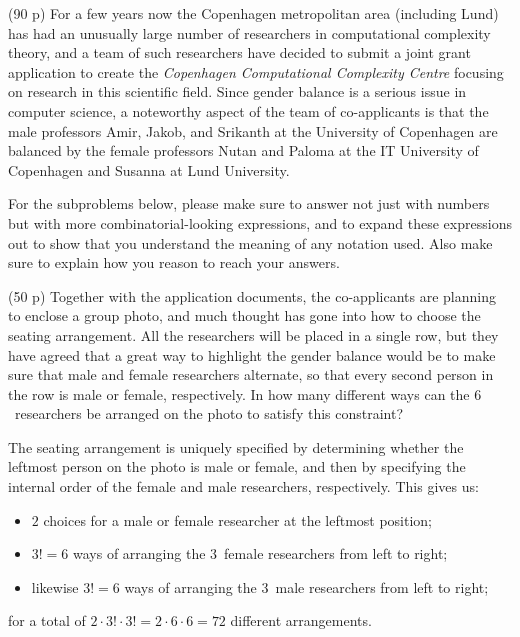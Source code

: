 \documentclass{jn-pset}
\begin{document}

\begin{problem}%
  \label{problem:combinatorics}%
  (90 p)
  For a few years now the Copenhagen metropolitan area 
  (including Lund) has had an unusually large number of researchers in 
  computational complexity theory, and a team of such
  researchers have decided to submit a joint grant application  to
  create the
  \emph{Copenhagen Computational Complexity Centre}
  focusing on research in this scientific field.
  Since gender balance is a serious issue in computer science, 
  a noteworthy aspect of the team of co-applicants is that
  the male professors
  Amir, Jakob, and Srikanth at the University of Copenhagen
  are balanced by the female professors
  Nutan and Paloma at the IT University of Copenhagen and
  Susanna at Lund University.

  For the subproblems below, please make sure to answer not just with
  numbers but with more combinatorial-looking expressions, and to expand these
  expressions out to show that you understand the meaning of any
  notation used. Also make sure to explain how you reason to reach
  your answers.

  \begin{subproblem}
    {(50 p)}
    {\ignorespaces}
    Together with the application documents, the co-applicants are
    planning to enclose a group photo, and much thought has gone into
    how to choose the seating arrangement.
    All the researchers will be placed in a single row, but they have
    agreed that a great way to highlight the gender
    balance would be to make sure that male and female researchers
    alternate, so that every second person in the row
    is male or female, respectively.
    In how many different ways can the $6$~researchers be arranged on
    the photo to satisfy this constraint?
  \end{subproblem}

\begin{solution}
  The seating arrangement is uniquely specified by determining whether
  the leftmost person on the photo is male or female, and then by
  specifying the internal order of the female and male researchers,
  respectively.
  This gives us:
  \begin{itemize}
  \item
    $2$ choices for a male or female researcher at the leftmost position;
  \item
    $3! = 6$ ways of arranging the $3$~female researchers
    from left to right;
  \item
    likewise
    $3! = 6$ ways of arranging the $3$~male researchers
    from left to right;
  \end{itemize}
  for a total of
  $
  2 \cdot 3! \cdot 3!
  =
  2 \cdot 6 \cdot 6
  =
  72
  $
  different arrangements.
\end{solution}
  

\end{problem}
\end{document}
